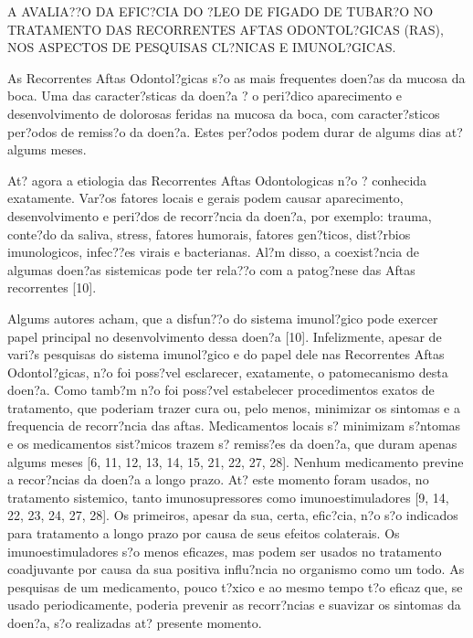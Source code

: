 \documentclass[12pt]{article}
\begin{document}
\begin{center}
\large{A AVALIA??O DA EFIC?CIA DO ?LEO DE FIGADO DE TUBAR?O NO TRATAMENTO DAS
RECORRENTES AFTAS ODONTOL?GICAS (RAS), NOS ASPECTOS DE PESQUISAS CL?NICAS E
IMUNOL?GICAS.}
\end{center}

 As Recorrentes Aftas Odontol?gicas s?o as mais frequentes doen?as da mucosa da
boca. Uma das caracter?sticas da doen?a ? o peri?dico aparecimento e
desenvolvimento de dolorosas feridas na mucosa da boca, com caracter?sticos
per?odos de remiss?o da doen?a. Estes per?odos podem durar de algums dias at?
algums meses.

 At? agora a etiologia das Recorrentes Aftas Odontologicas n?o ? conhecida
exatamente. Var?os fatores locais e gerais podem causar aparecimento,
desenvolvimento e peri?dos de recorr?ncia da doen?a, por exemplo: trauma,
conte?do da saliva, stress, fatores humorais, fatores gen?ticos, dist?rbios
imunologicos, infec??es virais e bacterianas. Al?m disso, a coexist?ncia de
algumas doen?as sistemicas pode ter rela??o com a patog?nese das Aftas
recorrentes [10].

 Algums autores acham, que a disfun??o do sistema imunol?gico pode exercer
papel principal no desenvolvimento dessa doen?a [10].  Infelizmente, apesar de
vari?s pesquisas do sistema imunol?gico e do papel dele nas Recorrentes Aftas
Odontol?gicas,  n?o foi poss?vel esclarecer, exatamente, o patomecanismo desta
doen?a. Como tamb?m n?o foi poss?vel estabelecer procedimentos exatos de
tratamento, que poderiam trazer cura ou, pelo menos, minimizar os sintomas e a
frequencia de recorr?ncia das aftas. Medicamentos locais s? minimizam s?ntomas
e os medicamentos sist?micos trazem s? remiss?es da doen?a, que duram apenas
algums meses  [6, 11, 12, 13, 14, 15, 21, 22, 27, 28].  Nenhum medicamento
previne a recor?ncias da doen?a a longo prazo. At? este momento foram usados,
no tratamento sistemico, tanto imunosupressores como imunoestimuladores [9, 14,
22, 23, 24, 27, 28]. Os primeiros, apesar da sua, certa, efic?cia, n?o s?o
indicados para tratamento a longo prazo por causa de seus efeitos
colaterais. Os imunoestimuladores s?o menos eficazes, mas podem ser usados no
tratamento coadjuvante por causa da sua positiva influ?ncia no organismo como
um todo.  As  pesquisas de um medicamento, pouco t?xico e ao mesmo tempo t?o
eficaz que, se usado periodicamente, poderia prevenir as recorr?ncias e
suavizar os sintomas da doen?a, s?o realizadas at? presente momento.
\end{document}
